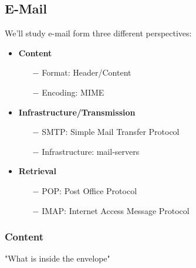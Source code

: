 \documentclass[a4paper, fontsize=8pt, landscape, DIV=1]{scrartcl}
\begin{document}
\begin{multicols*}{4}
		\subsection{E-Mail}
		We'll study e-mail form three different perspectives:
		\begin{itemize}[noitemsep]
			\item \textbf{Content}
			\begin{itemize}
				\item[$-$] Format: Header/Content
				\item[$-$] Encoding: MIME
			\end{itemize}
			\item \textbf{Infrastructure/Transmission}
			\begin{itemize}
				\item[$-$] SMTP: Simple Mail Transfer Protocol
				\item[$-$] Infrastructure: mail-servers 
			\end{itemize}
			\item \textbf{Retrieval}
			\begin{itemize}
				\item[$-$] POP: Post Office Protocol
				\item[$-$] IMAP: Internet Access Message Protocol
			\end{itemize}
		\end{itemize}
		
		\subsubsection{Content}
		"What is inside the envelope"\\
		

\end{multicols*}
\end{document}

